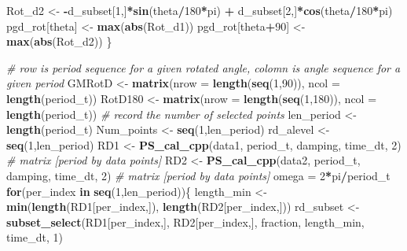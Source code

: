 \documentclass[]{article}
\newenvironment{Shaded}{\begin{snugshade}}{\end{snugshade}}
\newcommand{\KeywordTok}[1]{\textcolor[rgb]{0.13,0.29,0.53}{\textbf{#1}}}
\newcommand{\DataTypeTok}[1]{\textcolor[rgb]{0.13,0.29,0.53}{#1}}
\newcommand{\DecValTok}[1]{\textcolor[rgb]{0.00,0.00,0.81}{#1}}
\newcommand{\StringTok}[1]{\textcolor[rgb]{0.31,0.60,0.02}{#1}}
\newcommand{\CommentTok}[1]{\textcolor[rgb]{0.56,0.35,0.01}{\textit{#1}}}
\newcommand{\ControlFlowTok}[1]{\textcolor[rgb]{0.13,0.29,0.53}{\textbf{#1}}}
\newcommand{\OperatorTok}[1]{\textcolor[rgb]{0.81,0.36,0.00}{\textbf{#1}}}
\newcommand{\NormalTok}[1]{#1}
\begin{document}
\begin{Shaded}
\begin{Highlighting}[]
{\NormalTok{    Rot_d2 <-}\StringTok{ }\OperatorTok{-}\NormalTok{d_subset[}\DecValTok{1}\NormalTok{,]}\OperatorTok{*}\KeywordTok{sin}\NormalTok{(theta}\OperatorTok{/}\DecValTok{180}\OperatorTok{*}\NormalTok{pi) }\OperatorTok{+}\StringTok{ }\NormalTok{d_subset[}\DecValTok{2}\NormalTok{,]}\OperatorTok{*}\KeywordTok{cos}\NormalTok{(theta}\OperatorTok{/}\DecValTok{180}\OperatorTok{*}\NormalTok{pi)}
\NormalTok{    pgd_rot[theta] <-}\StringTok{ }\KeywordTok{max}\NormalTok{(}\KeywordTok{abs}\NormalTok{(Rot_d1))}
\NormalTok{    pgd_rot[theta}\OperatorTok{+}\DecValTok{90}\NormalTok{] <-}\StringTok{ }\KeywordTok{max}\NormalTok{(}\KeywordTok{abs}\NormalTok{(Rot_d2))}
\NormalTok{  \}}

  \CommentTok{# row is period sequence for a given rotated angle, colomn is angle sequence for a given period}
\NormalTok{  GMRotD <-}\StringTok{ }\KeywordTok{matrix}\NormalTok{(}\DataTypeTok{nrow =} \KeywordTok{length}\NormalTok{(}\KeywordTok{seq}\NormalTok{(}\DecValTok{1}\NormalTok{,}\DecValTok{90}\NormalTok{)), }\DataTypeTok{ncol =} \KeywordTok{length}\NormalTok{(period_t))}
\NormalTok{  RotD180 <-}\StringTok{ }\KeywordTok{matrix}\NormalTok{(}\DataTypeTok{nrow =} \KeywordTok{length}\NormalTok{(}\KeywordTok{seq}\NormalTok{(}\DecValTok{1}\NormalTok{,}\DecValTok{180}\NormalTok{)), }\DataTypeTok{ncol =} \KeywordTok{length}\NormalTok{(period_t))}
  \CommentTok{# record the number of selected points}
\NormalTok{  len_period <-}\StringTok{ }\KeywordTok{length}\NormalTok{(period_t)}
\NormalTok{  Num_points <-}\StringTok{ }\KeywordTok{seq}\NormalTok{(}\DecValTok{1}\NormalTok{,len_period)}
\NormalTok{  rd_alevel <-}\StringTok{ }\KeywordTok{seq}\NormalTok{(}\DecValTok{1}\NormalTok{,len_period)}
\NormalTok{  RD1 <-}\StringTok{ }\KeywordTok{PS_cal_cpp}\NormalTok{(data1, period_t, damping, time_dt, }\DecValTok{2}\NormalTok{) }\CommentTok{# matrix [period by data points]}
\NormalTok{  RD2 <-}\StringTok{ }\KeywordTok{PS_cal_cpp}\NormalTok{(data2, period_t, damping, time_dt, }\DecValTok{2}\NormalTok{) }\CommentTok{# matrix [period by data points]}
\NormalTok{  omega =}\StringTok{ }\DecValTok{2}\OperatorTok{*}\NormalTok{pi}\OperatorTok{/}\NormalTok{period_t}
  \ControlFlowTok{for}\NormalTok{(per_index }\ControlFlowTok{in} \KeywordTok{seq}\NormalTok{(}\DecValTok{1}\NormalTok{,len_period))\{}
\NormalTok{    length_min <-}\StringTok{ }\KeywordTok{min}\NormalTok{(}\KeywordTok{length}\NormalTok{(RD1[per_index,]), }\KeywordTok{length}\NormalTok{(RD2[per_index,]))}
\NormalTok{    rd_subset <-}\StringTok{ }\KeywordTok{subset_select}\NormalTok{(RD1[per_index,], RD2[per_index,], fraction, length_min, time_dt, }\DecValTok{1}\NormalTok{)}
}
\end{Highlighting}
\end{Shaded}
\end{document}
